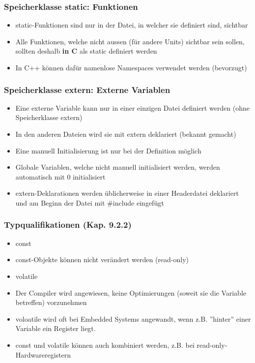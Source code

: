 \subsubsection{Speicherklasse static: Funktionen\hfill}
\label{sec:unterunterabschnitt}
\begin{itemize}
	\item static-Funktionen sind nur in der Datei, in welcher sie definiert sind, sichtbar
	\item Alle Funktionen, welche nicht aussen (für andere Units) sichtbar sein sollen, sollten deshalb \textbf{in C} als static definiert werden\color{\ownRed}
	\item In C++ können dafür namenlose Namespaces verwendet werden (bevorzugt)\color{black}
\end{itemize}

\subsubsection{Speicherklasse extern: Externe Variablen\hfill}
\label{sec:unterunterabschnitt}
\begin{itemize}
	\item Eine externe Variable kann nur in einer einzigen Datei definiert werden (ohne Speicherklasse extern)
	\item In den anderen Dateien wird sie mit extern deklariert (bekannt gemacht)
	\item Eine manuell Initialisierung ist nur bei der Definition möglich
	\item Globale Variablen, welche nicht manuell initialisiert werden, werden automatisch mit 0 initialisiert
	\item extern-Deklarationen werden üblicherweise in einer Headerdatei deklariert und am Beginn der Datei mit \#include eingefügt
\end{itemize}

\subsubsection{Typqualifikationen (Kap. 9.2.2)\hfill}
\label{sec:unterunterabschnitt}
\begin{itemize}
	\item const
	\item[\-] const-Objekte können nicht verändert werden (read-only)
	\item volatile
	\item[\-]Der Compiler wird angewiesen, keine Optimierungen (soweit sie die Variable betreffen) vorzunehmen
	\item voloatile wird oft bei Embedded Systems angewandt, wenn z.B. ''hinter'' einer Variable ein Register liegt.
	\item const und volatile können auch kombiniert werden, z.B. bei read-only-Hardwareregistern
\end{itemize}

